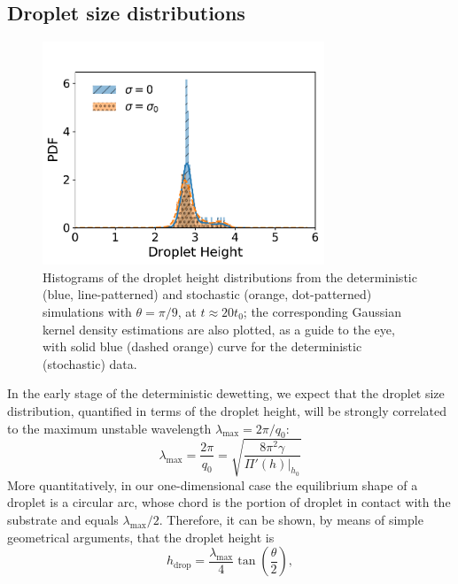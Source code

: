 \subsection{Droplet size distributions}\label{subsec:morphandrup}
\begin{figure}
    \centering
    \includegraphics[width=0.75\textwidth]{graphics/Droplet_height_['00', '1e-7']_distri_new_35_nodist.pdf}
    \caption{Histograms of the droplet height distributions from the deterministic (blue, line-patterned) and stochastic (orange, dot-patterned) simulations with $\theta = \pi/9$, at $t \approx 20 t_0$; the corresponding Gaussian kernel density estimations are also plotted, as a guide to the eye, with solid blue (dashed orange) curve for the deterministic (stochastic) data.}
    \label{fig:droplet_distribution}
\end{figure}
In the early stage of the deterministic dewetting, we expect that the droplet size distribution, quantified in terms of the droplet height, will be strongly correlated to the maximum unstable wavelength $\lambda_{\text{max}} =2\pi/q_0$:
\begin{equation}\label{eq:lambda_max}
    \lambda_{\text{max}} = \frac{2\pi}{q_0} = \sqrt{\frac{8\pi^2\gamma}{\Pi'(h)|_{h_0}}} 
\end{equation}
More quantitatively, in our one-dimensional case the equilibrium shape of a droplet is a circular arc, whose chord is the portion of droplet in contact with the substrate and equals $\lambda_{\text{max}}/2$. 
Therefore, it can be shown, by means of simple geometrical arguments, that the droplet height is
\begin{equation}\label{eq:cap_height}
   h_{\text{drop}} = \frac{\lambda_{\text{max}}}{4}\tan\left(\frac{\theta}{2}\right), 
\end{equation}
